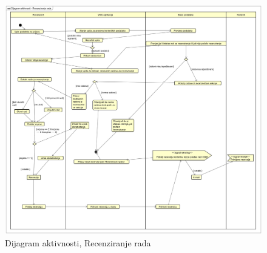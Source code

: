 			 \begin{figure}[H]
			 	\includegraphics[width = 15cm, keepaspectratio]{dijagrami/Dijagram aktivnosti - Recenziranje rada.png} 
			 	\centering
			 	\caption{Dijagram aktivnosti, Recenziranje rada}
			 	\label{fig:act1}
			 \end{figure}
